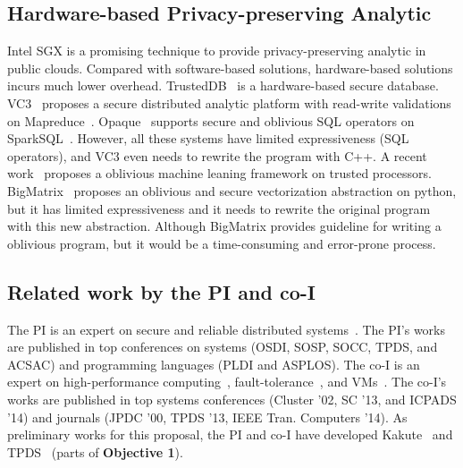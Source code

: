 \subsection{Hardware-based Privacy-preserving Analytic}
Intel SGX is a promising technique to provide privacy-preserving analytic
in public clouds. Compared with software-based solutions, hardware-based 
solutions
incurs much lower overhead. TrustedDB~\cite{trusteddb:sigmod11} is a
hardware-based secure database.
VC3~\cite{vc3:sp15} proposes a secure distributed analytic platform
with read-write validations on Mapreduce~\cite{mapreduce}. 
Opaque~\cite{opaque:nsdi17}
supports secure and oblivious SQL operators on 
SparkSQL~\cite{sparksql:sigmod15}.
However, all these systems have limited expressiveness (\eg SQL operators), and
VC3 even needs to rewrite the program with C++. A recent 
work~\cite{oblivious:security16} proposes a oblivious machine leaning
framework on trusted processors.
BigMatrix~\cite{bigmatrix:ccs17} proposes an oblivious and secure vectorization
abstraction on python, but it has limited expressiveness and it needs to
rewrite the original program with this new abstraction.
Although BigMatrix provides guideline for
writing a oblivious program, but it would be a time-consuming and error-prone
process.

\vspace{-.15in}\subsection{Related work by the PI and co-I} 
\label{sec:my-work}\vspace{-.075in}
% 

The PI is an expert on secure and reliable distributed 
systems~\cite{smt:cacm, cui:tern:osdi10, peregrine:sosp11,
parrot:sosp13, crane:sosp15, tripod:apsys16, kakute:acsac17, 
confluence:tpds17}. The PI's works are published in top conferences on systems 
(OSDI, SOSP, SOCC, TPDS, and ACSAC) and programming languages (PLDI and ASPLOS). 
The co-I is an expert on high-performance 
computing~\cite{powerrock,hwang,jessica,cheung,khokhar}, fault-tolerance~\cite{ 
sheng,shengdi1}, and VMs~\cite{rhymes,shengdi,jessica2}. The 
co-I's works are published in top systems conferences (Cluster '02, SC '13, 
and ICPADS '14) and journals (JPDC '00, TPDS '13, IEEE Tran. Computers '14). As 
preliminary works for this proposal, the PI and co-I have developed 
Kakute~\cite{kakute:acsac17} and TPDS~\cite{confluence:tpds17} (parts of 
\textbf{Objective 1}). 


